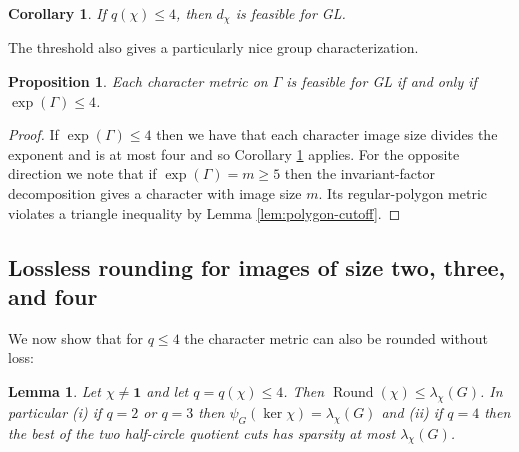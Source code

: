 \documentclass[11pt]{article}
\newtheorem{lemma}[theorem]{Lemma}
\newtheorem{proposition}[theorem]{Proposition}
\newtheorem{corollary}[theorem]{Corollary}
\theoremstyle{definition}
\theoremstyle{remark}
\newcommand{\roundval}{\operatorname{Round}}
\begin{document}
\begin{corollary}\label{cor:low-q-feasible}
If $q(\chi)\leq 4$, then $d_\chi$ is feasible for GL.
\end{corollary}


The threshold also gives a particularly nice group characterization.

\begin{proposition}
\label{prop:universal-character-feasibility}
Each character metric on $\Gamma$ is feasible for GL if and only if $\exp(\Gamma)\leq 4$.
\end{proposition}

\begin{proof}
If $\exp(\Gamma)\leq 4$ then we have that each character image size divides the exponent and is at most four and so Corollary \ref{cor:low-q-feasible} applies. 
For the opposite direction we note that if $\exp(\Gamma) = m\geq 5$ then the invariant-factor decomposition gives a character with image size $m$. Its regular-polygon metric violates a triangle inequality by Lemma \ref{lem:polygon-cutoff}.
\end{proof}





\subsection{Lossless rounding for images of size two, three, and four}
We now show that for $q \leq 4$ the character metric can also be rounded without loss:

\begin{lemma}
\label{lem:low-order-rounding}
Let $\chi\neq \mathbf{1}$ and let $q=q(\chi)\leq4$. Then $  \roundval(\chi)\le\lambda_\chi(G)$.
In particular (i) if $q=2$ or $q=3$ then $\psi_G(\ker\chi)=\lambda_\chi(G)$ and (ii) if $q=4$ then the best of the two half-circle quotient cuts has sparsity at most $\lambda_\chi(G)$.
\end{lemma}
\end{document}
